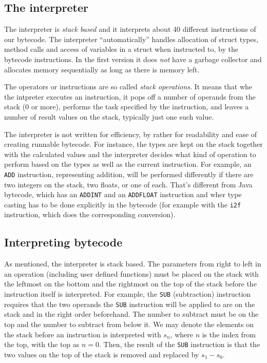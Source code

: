 \documentclass[11pt]{article}
\begin{document}
\subsection{The interpreter}
\label{sec:org7d9d84c}

The interpreter is \emph{stack based} and it interprets about 40 different
instructions of our bytecode.  The interpreter ``automatically'' handles
allocation of struct types, method calls and access of variables in a
struct when instructed to, by the bytecode instructions. In the first
version it does \emph{not} have a garbage collector and allocates memory
sequentially as long as there is memory left.

The operators or instructions are so called \emph{stack operations}. It means that
whe the intpreter executes an instruction, it pops off a number of operands
from the stack (0 or more), performs the task specified by the instruction,
and leaves a number of result values on the stack, typically just one such
value.

The interpreter is not written for efficiency, by rather for readability
and ease of creating runnable bytecode. For instance, the types are kept on
the stack together with the calculated values and the interpreter decides
what kind of operation to perform based on the types as well as the current
instruction. For example, an \texttt{ADD} instruction, representing addition, will
be performed differently if there are two integers on the stack, two
floats, or one of each. That's different from Java bytecode, which has an
\texttt{ADDINT} and an \texttt{ADDFLOAT} instruction and wher type casting has to be done
explicitly in the bytecode (for example with the \texttt{i2f} instruction, which
does the corresponding conversion).

\subsection{Interpreting bytecode}
\label{sec:orgb91ad79}


As mentioned, the interpreter is stack based. The parameters from right to
left in an operation (including user defined functions) must be placed on
the stack with the leftmost on the bottom and the rightmost on the top of
the stack before the instruction itself is interpreted. For example, the
\texttt{SUB} (subtraction) instruction requires that the two operands the \texttt{SUB}
instruction will be applied to are on the stack and in the right order
beforehand. The number to subtract must be on the top and the number to
subtract from below it. We may denote the elements on the stack before an
instruction is interpreted with \(s_n\), where \(n\) is the index from the top,
with the top as \(n = 0\). Then, the result of the \texttt{SUB} instruction is that
the two values on the top of the stack is removed and replaced by \(s_1 -
s_0\).
\end{document}
